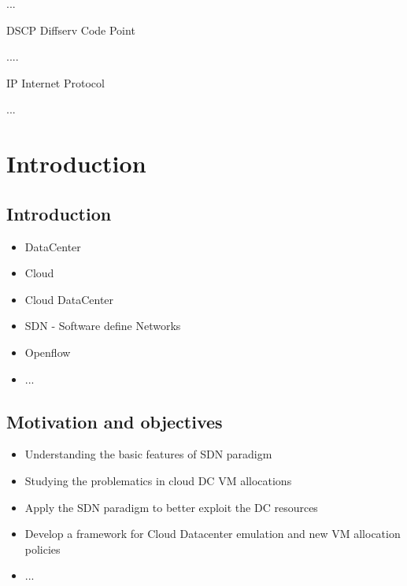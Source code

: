 \documentclass[12pt,english]{book}
\newenvironment{lyxlist}[1]
   {\begin{list}{}
     {\settowidth{\labelwidth}{#1}
      \setlength{\leftmargin}{\labelwidth}
      \addtolength{\leftmargin}{\labelsep}
      \renewcommand{\makelabel}[1]{##1\hfil}}}
   {\end{list}}
\begin{document}
\begin{lyxlist}{00.00.0000}
\begin{singlespace}
\item ...
\item [DSCP]Diffserv Code Point 
\item ....
\item [IP]Internet Protocol 
\item ...
\end{singlespace}
\end{lyxlist}

\cleardoublepage

\listoffigures

\cleardoublepage

\listoftables

\cleardoublepage

\setcounter{page}{0}



\chapter{Introduction\label{cha:introduction}}

\section{Introduction}

\begin{itemize}
	\item DataCenter
	\item Cloud
	\item Cloud DataCenter
	\item SDN - Software define Networks
	\item Openflow
	\item ...
\end{itemize}

\section{Motivation and objectives\label{sec:motobj}}

\begin{itemize}
	\item Understanding the basic features of SDN paradigm
	\item Studying the problematics in cloud DC VM allocations
	\item Apply the SDN paradigm to better exploit the DC resources
	\item Develop a framework for Cloud Datacenter emulation and new VM allocation policies
	\item ...
\end{itemize}
\end{document}
